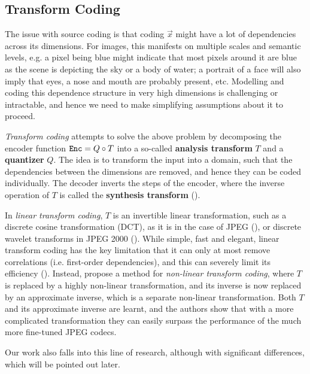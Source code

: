 \subsection{Transform Coding}
\label{sec:transform_coding}
The issue with source coding is that coding $\vec{x}$ might have a lot of
dependencies across its dimensions. For images, this manifests on multiple
scales and semantic levels, e.g. a pixel being blue might indicate that most
pixels around it are blue as the scene is depicting the sky or a body of water;
a portrait of a face will also imply that eyes, a nose and mouth are probably
present, etc. Modelling and coding this dependence structure in very high
dimensions is challenging or intractable, and hence we need
to make simplifying assumptions about it to proceed.
\par
\textit{Transform coding} attempts to solve the above problem by decomposing the
encoder function $\mathtt{Enc} = Q \circ T$ into a so-called \textbf{analysis transform}
$T$ and a \textbf{quantizer} $Q$. The idea is to transform the input into a
domain, such that the dependencies between the dimensions are removed, and hence
they can be coded individually. The decoder inverts the steps of the encoder,
where the inverse operation of $T$ is called the \textbf{synthesis transform}
(\cite{gupta2011modified}).
\par
In \textit{linear transform coding}, $T$ is an invertible linear transformation,
such as a discrete cosine transformation (DCT), as it is in the case of JPEG
(\cite{wallace1992jpeg}), or discrete wavelet transforms in JPEG 2000
(\cite{rabbani2002overview}). While simple, fast and elegant, linear transform
coding has the key limitation that it can only at most remove correlations (i.e.
first-order dependencies), and this can severely limit its efficiency
(\cite{balle2016endtrans}). Instead, \cite{balle2016endtrans} propose a method for
\textit{non-linear transform coding}, where $T$ is replaced by a highly
non-linear transformation, and its inverse is now replaced by an approximate
inverse, which is a separate non-linear transformation. Both $T$ and its
approximate inverse are learnt, and the authors show that with a more
complicated transformation they can easily surpass the performance of the much
more fine-tuned JPEG codecs.
\par
Our work also falls into this line of research, although with significant
differences, which will be pointed out later.

